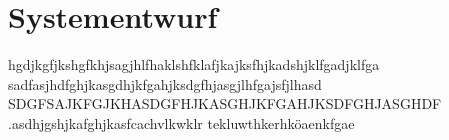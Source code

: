 \chapter{Systementwurf}
hgdjkgfjkshgfkhjsagjhlfhaklshfklafjkajksfhjkadshjklfgadjklfga
sadfasjhdfghjkasgdhjkfgahjksdgfhjasgjlhfgajsfjlhasd
SDGFSAJKFGJKHASDGFHJKASGHJKFGAHJKSDFGHJASGHDF
.asdhjgshjkafghjkasfcachvlkwklr tekluwthkerhköaenkfgae